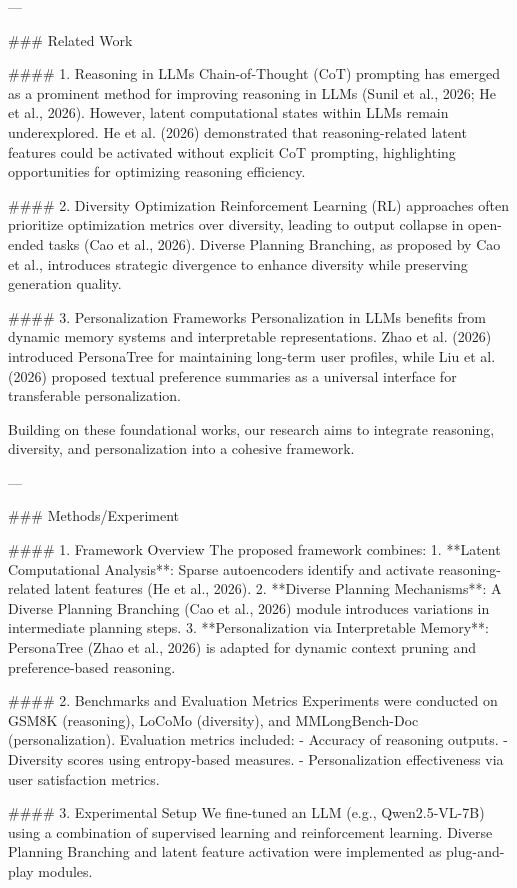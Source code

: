 ---

### Related Work

#### 1. Reasoning in LLMs
Chain-of-Thought (CoT) prompting has emerged as a prominent method for improving reasoning in LLMs (Sunil et al., 2026; He et al., 2026). However, latent computational states within LLMs remain underexplored. He et al. (2026) demonstrated that reasoning-related latent features could be activated without explicit CoT prompting, highlighting opportunities for optimizing reasoning efficiency.

#### 2. Diversity Optimization
Reinforcement Learning (RL) approaches often prioritize optimization metrics over diversity, leading to output collapse in open-ended tasks (Cao et al., 2026). Diverse Planning Branching, as proposed by Cao et al., introduces strategic divergence to enhance diversity while preserving generation quality.

#### 3. Personalization Frameworks
Personalization in LLMs benefits from dynamic memory systems and interpretable representations. Zhao et al. (2026) introduced PersonaTree for maintaining long-term user profiles, while Liu et al. (2026) proposed textual preference summaries as a universal interface for transferable personalization.

Building on these foundational works, our research aims to integrate reasoning, diversity, and personalization into a cohesive framework.

---

### Methods/Experiment

#### 1. Framework Overview
The proposed framework combines:
1. **Latent Computational Analysis**: Sparse autoencoders identify and activate reasoning-related latent features (He et al., 2026).
2. **Diverse Planning Mechanisms**: A Diverse Planning Branching (Cao et al., 2026) module introduces variations in intermediate planning steps.
3. **Personalization via Interpretable Memory**: PersonaTree (Zhao et al., 2026) is adapted for dynamic context pruning and preference-based reasoning.

#### 2. Benchmarks and Evaluation Metrics
Experiments were conducted on GSM8K (reasoning), LoCoMo (diversity), and MMLongBench-Doc (personalization). Evaluation metrics included:
- Accuracy of reasoning outputs.
- Diversity scores using entropy-based measures.
- Personalization effectiveness via user satisfaction metrics.

#### 3. Experimental Setup
We fine-tuned an LLM (e.g., Qwen2.5-VL-7B) using a combination of supervised learning and reinforcement learning. Diverse Planning Branching and latent feature activation were implemented as plug-and-play modules.

